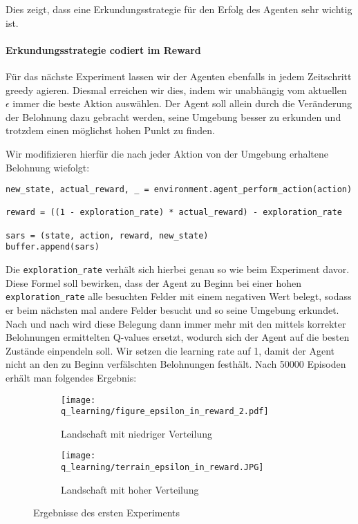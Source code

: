 Dies zeigt, dass eine Erkundungsstrategie für den Erfolg des Agenten sehr wichtig ist.

\paragraph{Erkundungsstrategie codiert im Reward}
Für das nächste Experiment lassen wir der Agenten ebenfalls in jedem Zeitschritt greedy agieren. Diesmal erreichen wir dies, indem wir unabhängig vom aktuellen $ \epsilon $ immer die beste Aktion auswählen. Der Agent soll allein durch die Veränderung der Belohnung dazu gebracht werden, seine Umgebung besser zu erkunden und trotzdem einen möglichst hohen Punkt zu finden.

Wir modifizieren hierfür die nach jeder Aktion von der Umgebung erhaltene Belohnung wiefolgt:
\begin{verbatim}
new_state, actual_reward, _ = environment.agent_perform_action(action)

reward = ((1 - exploration_rate) * actual_reward) - exploration_rate

sars = (state, action, reward, new_state)
buffer.append(sars)
\end{verbatim}
Die \texttt{exploration_rate} verhält sich hierbei genau so wie beim Experiment davor. Diese Formel soll bewirken, dass der Agent zu Beginn bei einer hohen \texttt{exploration_rate} alle besuchten Felder mit einem negativen Wert belegt, sodass er beim nächsten mal andere Felder besucht und so seine Umgebung erkundet. Nach und nach wird diese Belegung dann immer mehr mit den mittels korrekter Belohnungen ermittelten Q-values ersetzt, wodurch sich der Agent auf die besten Zustände einpendeln soll. Wir setzen die learning rate auf 1, damit der Agent nicht an den zu Beginn verfälschten Belohnungen festhält. Nach 50000 Episoden erhält man folgendes Ergebnis:
\begin{figure}[H]
    \centering
    \begin{subfigure}[b]{0.49\textwidth}
        \texttt{[image: q\_learning/figure\_epsilon\_in\_reward\_2.pdf]}
        \caption{Landschaft mit niedriger Verteilung}
        \label{img:graphQEpsInRew}
    \end{subfigure}
    \begin{subfigure}[b]{0.49\textwidth}
        \texttt{[image: q\_learning/terrain\_epsilon\_in\_reward.JPG]}
        \caption{Landschaft mit hoher Verteilung}
        \label{img:pathQEpsInRew}
    \end{subfigure}
    \caption{Ergebnisse des ersten Experiments}
\end{figure}
